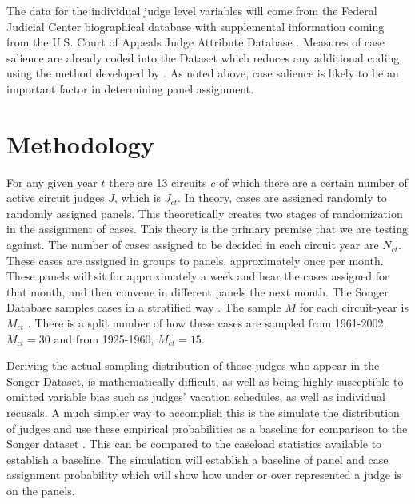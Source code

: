 \documentclass[12pt]{article}
\begin{document}
The data for the individual judge level variables will come from the Federal Judicial Center biographical database with supplemental information coming from the U.S. Court of Appeals Judge Attribute Database \citep{FJC}. Measures of case salience are already coded into the \citeauthor{Songer2007} Dataset which reduces any additional coding, using the method developed by \cite{Hettinger2003}.  As noted above, case salience is likely to be an important factor in determining panel assignment.

\section{Methodology}\label{Methods}
For any given year $t$ there are 13 circuits $c$ of which there are a certain number of active circuit judges $J$, which is $J_{ct}$.  In theory, cases are assigned randomly to randomly assigned panels.  This theoretically creates two stages of randomization in the assignment of cases.  This theory is the primary premise that we are testing against.  The number of cases assigned to be decided in each circuit year are $N_{ct}$.  These cases are assigned in groups to panels, approximately once per month.  These panels will sit for approximately a week and hear the cases assigned for that month, and then convene in different panels the next month.  The Songer Database samples cases in a stratified way \citep{Songer2007}.  The sample $M$ for each circuit-year is $M_{ct}$ \citep{Songer2007}.  There is a split number of how these cases are sampled from 1961-2002, $M_{ct}=30$ and from 1925-1960, $M_{ct}=15$.  

Deriving the actual sampling distribution of those judges who appear in the Songer Dataset, is mathematically difficult, as well as being highly susceptible to omitted variable bias such as judges' vacation schedules, as well as individual recusals.  A much simpler way to accomplish this is the simulate the distribution of judges and use these empirical probabilities as a baseline for comparison to the Songer dataset \citep{Songer2007}.  This can be compared to the caseload statistics available to establish a baseline. The simulation will establish a baseline of panel and case assignment probability which will show how under or over represented a judge is on the panels. 
\end{document}
